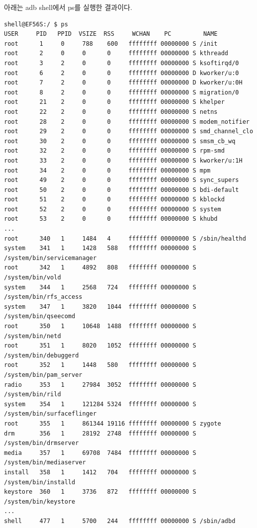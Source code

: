아래는 adb shell에서 ps를 실행한 결과이다.
\begin{lstlisting}[frame=single] 
shell@EF56S:/ $ ps
USER     PID   PPID  VSIZE  RSS     WCHAN    PC         NAME
root      1     0     788    600   ffffffff 00000000 S /init
root      2     0     0      0     ffffffff 00000000 S kthreadd
root      3     2     0      0     ffffffff 00000000 S ksoftirqd/0
root      6     2     0      0     ffffffff 00000000 D kworker/u:0
root      7     2     0      0     ffffffff 00000000 D kworker/u:0H
root      8     2     0      0     ffffffff 00000000 S migration/0
root      21    2     0      0     ffffffff 00000000 S khelper
root      22    2     0      0     ffffffff 00000000 S netns
root      28    2     0      0     ffffffff 00000000 S modem_notifier
root      29    2     0      0     ffffffff 00000000 S smd_channel_clo
root      30    2     0      0     ffffffff 00000000 S smsm_cb_wq
root      32    2     0      0     ffffffff 00000000 S rpm-smd
root      33    2     0      0     ffffffff 00000000 S kworker/u:1H
root      34    2     0      0     ffffffff 00000000 S mpm
root      49    2     0      0     ffffffff 00000000 S sync_supers
root      50    2     0      0     ffffffff 00000000 S bdi-default
root      51    2     0      0     ffffffff 00000000 S kblockd
root      52    2     0      0     ffffffff 00000000 S system
root      53    2     0      0     ffffffff 00000000 S khubd
...
root      340   1     1484   4     ffffffff 00000000 S /sbin/healthd
system    341   1     1428   588   ffffffff 00000000 S /system/bin/servicemanager
root      342   1     4892   808   ffffffff 00000000 S /system/bin/vold
system    344   1     2568   724   ffffffff 00000000 S /system/bin/rfs_access
system    347   1     3820   1044  ffffffff 00000000 S /system/bin/qseecomd
root      350   1     10648  1488  ffffffff 00000000 S /system/bin/netd
root      351   1     8020   1052  ffffffff 00000000 S /system/bin/debuggerd
root      352   1     1448   580   ffffffff 00000000 S /system/bin/pam_server
radio     353   1     27984  3052  ffffffff 00000000 S /system/bin/rild
system    354   1     121284 5324  ffffffff 00000000 S /system/bin/surfaceflinger
root      355   1     861344 19116 ffffffff 00000000 S zygote
drm       356   1     28192  2748  ffffffff 00000000 S /system/bin/drmserver
media     357   1     69708  7484  ffffffff 00000000 S /system/bin/mediaserver
install   358   1     1412   704   ffffffff 00000000 S /system/bin/installd
keystore  360   1     3736   872   ffffffff 00000000 S /system/bin/keystore
...
shell     477   1     5700   244   ffffffff 00000000 S /sbin/adbd

\end{lstlisting}
